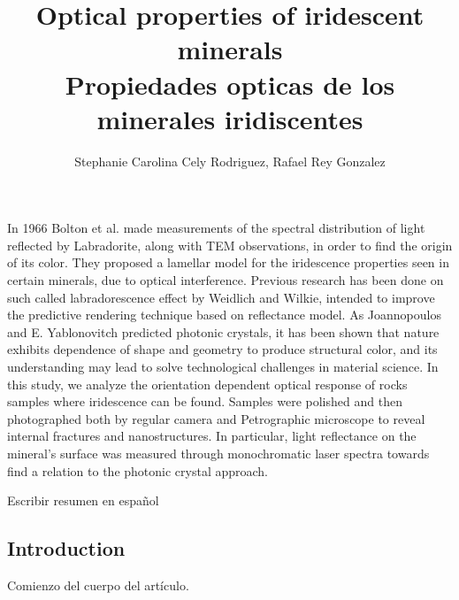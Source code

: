 \documentclass{momento}
\title{ Optical properties of iridescent minerals\\[0.5cm]
Propiedades opticas de los minerales iridiscentes}
\author{Stephanie Carolina Cely Rodriguez\suprm1, Rafael Rey Gonzalez \suprm2 }
\begin{document}
\begin{sloppypar}
  \maketitle


\begin{ingles}
In 1966  Bolton et al. made measurements of the spectral distribution of light reflected by Labradorite, along with TEM observations, in order to find the origin of its color. They proposed a lamellar model for the iridescence properties seen in certain minerals, due to optical interference. 
Previous research has been done on such called labradorescence effect by Weidlich and Wilkie, intended to improve the predictive rendering technique based on reflectance model.
As Joannopoulos and E. Yablonovitch predicted photonic crystals, it has been shown that nature exhibits dependence of shape and geometry to produce structural color, and its understanding may lead to solve technological challenges in material science.
In this study, we analyze the orientation dependent optical response of rocks samples where iridescence can be found.
Samples were polished and then photographed both by regular camera and Petrographic microscope to reveal internal fractures and nanostructures. 
In particular, light reflectance on the mineral's surface was measured through monochromatic laser spectra towards find a relation to the photonic crystal approach.
\end{ingles}

\begin{resumen}
Escribir resumen en español
\end{resumen}



\subsection*{Introduction}

Comienzo del cuerpo del artículo.\\


\end{sloppypar}
\end{document}
